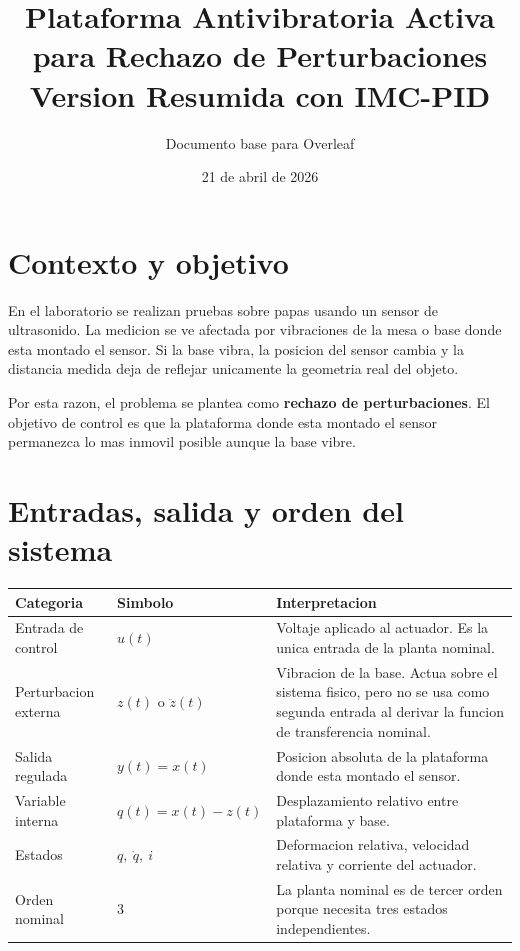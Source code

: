 \documentclass[11pt]{article}
\title{Plataforma Antivibratoria Activa para Rechazo de Perturbaciones\\Version Resumida con IMC-PID}
\author{Documento base para Overleaf}
\date{21 de abril de 2026}
\begin{document}
\maketitle
\tableofcontents
\newpage

\section{Contexto y objetivo}

En el laboratorio se realizan pruebas sobre papas usando un sensor de ultrasonido. La medicion se ve afectada por vibraciones de la mesa o base donde esta montado el sensor. Si la base vibra, la posicion del sensor cambia y la distancia medida deja de reflejar unicamente la geometria real del objeto.

Por esta razon, el problema se plantea como \textbf{rechazo de perturbaciones}. El objetivo de control es que la plataforma donde esta montado el sensor permanezca lo mas inmovil posible aunque la base vibre.

\section{Entradas, salida y orden del sistema}

\begin{center}
\small
\begin{tabular}{>{\raggedright\arraybackslash}p{3.0cm} >{\raggedright\arraybackslash}p{2.8cm} >{\raggedright\arraybackslash}p{7.2cm}}
\toprule
\textbf{Categoria} & \textbf{Simbolo} & \textbf{Interpretacion} \\
\midrule
Entrada de control & $u(t)$ & Voltaje aplicado al actuador. Es la unica entrada de la planta nominal. \\
Perturbacion externa & $z(t)$ o $\ddot z(t)$ & Vibracion de la base. Actua sobre el sistema fisico, pero no se usa como segunda entrada al derivar la funcion de transferencia nominal. \\
Salida regulada & $y(t)=x(t)$ & Posicion absoluta de la plataforma donde esta montado el sensor. \\
Variable interna & $q(t)=x(t)-z(t)$ & Desplazamiento relativo entre plataforma y base. \\
Estados & $q,\ \dot q,\ i$ & Deformacion relativa, velocidad relativa y corriente del actuador. \\
Orden nominal & $3$ & La planta nominal es de tercer orden porque necesita tres estados independientes. \\
\bottomrule
\end{tabular}
\end{center}
\end{document}
